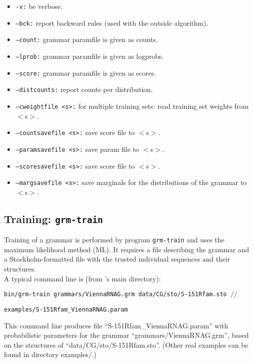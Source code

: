 \begin{itemize}
 \item \texttt{-v:}                  be verbose.
 \item \texttt{--bck:}               report backward rules (used with the outside algorithm).
 \item \texttt{--count:}             grammar paramfile is given as counts.
 \item \texttt{--lprob:}             grammar paramfile is given as logprobs.
 \item \texttt{--score:}             grammar paramfile is given as scores.
 \item \texttt{--distcounts:}        report counts per distribution.
 \item \texttt{--cweightfile  <s>:}  for multiple training sets: read training set weights from $<$s$>$.
 \item \texttt{--countsavefile <s>:} save score file to $<$s$>$.
 \item \texttt{--paramsavefile <s>:} save param file to $<$s$>$.
 \item \texttt{--scoresavefile <s>:} save score file to $<$s$>$.
 \item \texttt{--margsavefile  <s>:} save marginals for the distributions of the grammar to $<$s$>$.
\end{itemize}


\subsection{Training: \texttt{grm-train}}

Training of a grammar is performed by program \texttt{grm-train} and
uses the maximum likelihood method (ML). It requires a file describing
the grammar and a
Stockholm-formatted file with the trusted individual sequences and
their structures.\\

\noindent
A typical command line is (from \tornado's main directory):\\

\begin{footnotesize}
 \texttt{bin/grm-train grammars/ViennaRNAG.grm data/CG/sto/S-151Rfam.sto $//$}

 \hspace{15mm}\texttt{examples/S-151Rfam\_ViennaRNAG.param}\\
\end{footnotesize}

\noindent
This command line produces file ``S-151Rfam\_ViennaRNAG.param'' with
probabilistic parameters for the grammar ``grammars/ViennaRNAG.grm'',
based on the structures of ``data/CG/sto/S-151Rfam.sto''. (Other real
examples can be found in directory examples/.)\\

